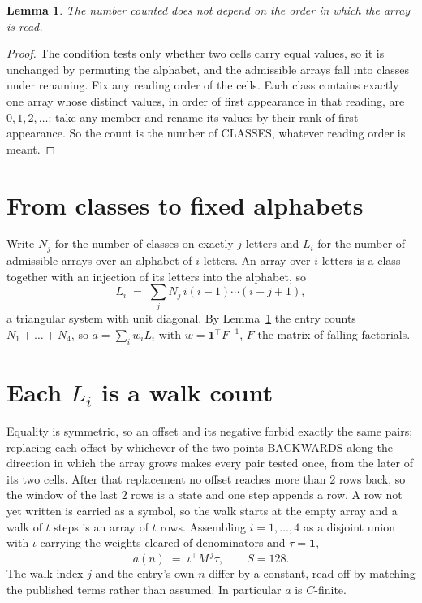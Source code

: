 \documentclass[11pt,a4paper]{article}
\theoremstyle{plain}
\newtheorem{lemma}[theorem]{Lemma}
\theoremstyle{definition}
\begin{document}
\begin{lemma}\label{lem:order}
The number counted does not depend on the order in which the array is read.
\end{lemma}

\begin{proof}
The condition tests only whether two cells carry equal values, so it is unchanged by permuting
the alphabet, and the admissible arrays fall into classes under renaming. Fix any reading order
of the cells. Each class contains exactly one array whose distinct values, in order of first
appearance in that reading, are $0,1,2,\dots$: take any member and rename its values by their
rank of first appearance. So the count is the number of CLASSES, whatever reading order is
meant.
\end{proof}

\section{From classes to fixed alphabets}

Write $N_j$ for the number of classes on exactly $j$ letters and $L_i$ for the number of
admissible arrays over an alphabet of $i$ letters. An array over $i$ letters is a class together
with an injection of its letters into the alphabet, so
\[
L_i\;=\;\sum_j N_j\,i(i-1)\cdots(i-j+1),
\]
a triangular system with unit diagonal. By Lemma~\ref{lem:order} the entry counts
$N_1+\dots+N_{4}$, so $a=\sum_i w_iL_i$ with $w=\mathbf{1}^{\!\top}F^{-1}$, $F$ the
matrix of falling factorials.

\section{Each $L_i$ is a walk count}

Equality is symmetric, so an offset and its negative forbid exactly the same pairs; replacing
each offset by whichever of the two points BACKWARDS along the direction in which the array
grows makes every pair tested once, from the later of its two cells. After that replacement no
offset reaches more than $2$ rows back, so the window of the last $2$
rows is a state and one step appends a row. A row not yet written is
carried as a symbol, so the walk starts at the empty array and a walk of $t$ steps is an array
of $t$ rows. Assembling $i=1,\dots,4$ as a disjoint union with $\iota$ carrying the
weights cleared of denominators and $\tau=\mathbf{1}$,
\[
a(n)\;=\;\iota^{\!\top}M^{\,j}\tau ,\qquad S=128.
\]
The walk index $j$ and the entry's own $n$ differ by a constant, read off by matching the
published terms rather than assumed. In particular $a$ is $C$-finite.
\end{document}
